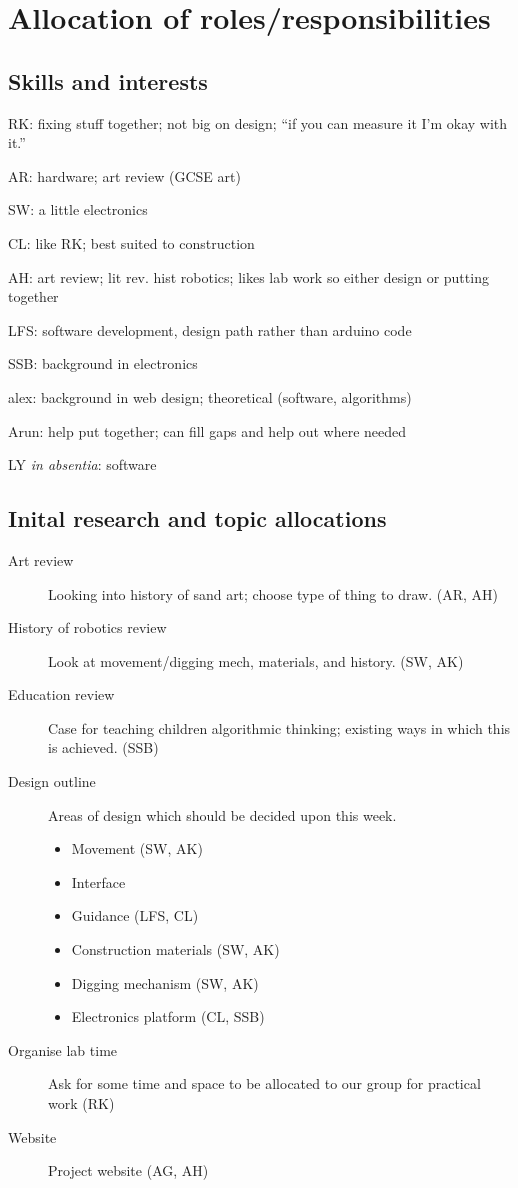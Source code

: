 \section{Allocation of roles/responsibilities}
\subsection{Skills and interests}
\begin{items}
    \item RK: fixing stuff together; not big on design; ``if you can measure it I'm okay with it.''
    \item AR: hardware; art review (GCSE art)
    \item SW: a little electronics
    \item CL: like RK; best suited to construction
    \item AH: art review; lit rev. hist robotics; likes lab work so either design or putting together
    \item LFS: software development, design path rather than arduino code
    \item SSB: background in electronics
    \item alex: background in web design; theoretical (software, algorithms)
    \item Arun: help put together; can fill gaps and help out where needed
    \item LY \emph{in absentia}: software
\end{items}
\subsection{Inital research and topic allocations}
\begin{description}
    \item[Art review] Looking into history of sand art; choose type of thing to draw. (AR, AH)
    \item[History of robotics review] Look at movement/digging mech, materials, and history. (SW, AK)
    \item[Education review] Case for teaching children algorithmic thinking; existing ways in which this is achieved. (SSB)
    \item[Design outline] Areas of design which should be decided upon this week.
    \begin{itemize}
        \item Movement (SW, AK)
        \item Interface
        \item Guidance (LFS, CL)
        \item Construction materials (SW, AK)
        \item Digging mechanism (SW, AK)
        \item Electronics platform (CL, SSB)
    \end{itemize}
    \item[Organise lab time] Ask for some time and space to be allocated to our group for practical work (RK)
    \item[Website] Project website (AG, AH)
\end{description}

